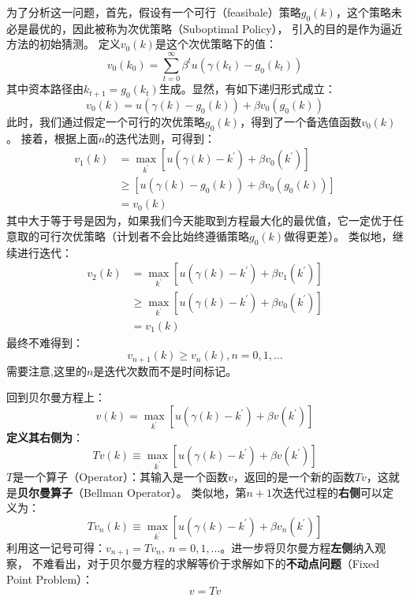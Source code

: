 为了分析这一问题，首先，假设有一个可行（feasibale）策略$g_0\left(k\right)$，这个策略未必是最优的，因此被称为次优策略（Suboptimal Policy），
引入的目的是作为逼近方法的初始猜测。
定义$v_0\left(k\right)$是这个次优策略下的值：
$$
v_0\left(k_0\right) = \sum_{t=0}^{\infty} \beta^t u\left(\gamma\left(k_t\right)-g_0\left(k_t\right)\right)
$$
其中资本路径由$k_{t+1}=g_0\left(k_t\right)$生成。显然，有如下递归形式成立：
$$
v_0\left(k\right) = u\left(\gamma\left(k\right)-g_0\left(k\right)\right) + \beta v_0\left(g_0\left(k\right)\right)
$$
此时，我们通过假定一个可行的次优策略$g_0\left(k\right)$，得到了一个备选值函数$v_0\left(k\right)$。
接着，根据上面$n$的迭代法则，可得到：
$$
\begin{aligned}
    v_1\left(k\right) &= \max _{k^{\prime}}\left[u\left(\gamma\left(k\right)-k^{\prime}\right) + \beta v_0\left(k^{\prime}\right)\right] \\
                &\geq \left[u\left(\gamma\left(k\right)-g_0\left(k\right)\right) + \beta v_0\left(g_0\left(k\right)\right)\right] \\
                &= v_0\left(k\right)   
\end{aligned}
$$
其中大于等于号是因为，如果我们今天能取到方程最大化的最优值，它一定优于任意取的可行次优策略（计划者不会比始终遵循策略$g_0(k)$做得更差）。
类似地，继续进行迭代：
$$
\begin{aligned}
    v_2\left(k\right) &= \max _{k^{\prime}}\left[u\left(\gamma\left(k\right)-k^{\prime}\right) + \beta v_1\left(k^{\prime}\right)\right] \\
                &\geq \max _{k^{\prime}}\left[u\left(\gamma\left(k\right)-k^{\prime}\right) + \beta v_0\left(k^{\prime}\right)\right] \\
                &= v_1\left(k\right)   
\end{aligned}
$$
最终不难得到：
$$v_{n+1}\left(k\right) \geq v_{n}\left(k\right), n=0,1,\dots$$
需要注意,这里的$n$是迭代次数而不是时间标记。

回到贝尔曼方程上：
\begin{equation*}
v\left(k\right)=\max _{k^{\prime}}\left[u\left(\gamma\left(k\right)-k^{\prime}\right)+\beta v\left(k^{\prime}\right)\right]
\end{equation*}
\textbf{定义其右侧为}：
\begin{equation}    \label{eq-operator}
    Tv\left(k\right) \equiv \max _{k^{\prime}} \left[u\left(\gamma\left(k\right)-k^{\prime}\right)+\beta v\left(k^{\prime}\right)\right]
\end{equation}
$T$是一个算子（Operator）：其输入是一个函数$v$，返回的是一个新的函数$Tv$，这就是\textbf{贝尔曼算子}（Bellman Operator）。
类似地，第$n+1$次迭代过程的\textbf{右侧}可以定义为：
$$
Tv_n\left(k\right) \equiv \max _{k^{\prime}} \left[u\left(\gamma\left(k\right)-k^{\prime}\right)+\beta v_n\left(k^{\prime}\right)\right]
$$
利用这一记号可得：$v_{n+1}=Tv_n, ~ n=0,1,\dots$。进一步将贝尔曼方程\textbf{左侧}纳入观察，
不难看出，对于贝尔曼方程的求解等价于求解如下的\textbf{不动点问题}（Fixed Point Problem）：
$$v = Tv$$

